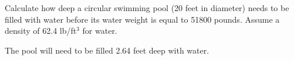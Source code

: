 

Calculate how deep a circular swimming pool (20 feet in diameter) needs to be filled with water before its water weight is equal to 51800 pounds.  Assume a density of 62.4 lb/ft$^{3}$ for water.







The pool will need to be filled 2.64 feet deep with water. 












